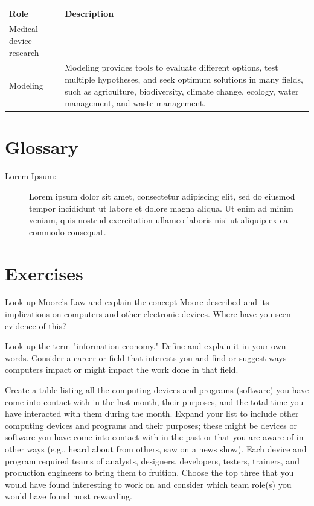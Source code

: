 \begin{table}[H]
	\begin{center}
		\begin{tabular}{p{1.3in}|p{3in}} 
			\textbf{Role} & \textbf{Description}\\
			\hline
			Medical device research & \\
			\hline
			Modeling & Modeling provides tools to evaluate different options, test multiple hypotheses, and seek optimum solutions in many fields, such as agriculture, biodiversity, climate change, ecology, water management, and waste management.\\
		\end{tabular}
	\end{center}
\end{table}

\section{Glossary}

\begin{description}
	
	\item[Lorem Ipsum:]  Lorem ipsum dolor sit amet, consectetur adipiscing elit, sed do eiusmod tempor incididunt ut labore et dolore magna aliqua. Ut enim ad minim veniam, quis nostrud exercitation ullamco laboris nisi ut aliquip ex ea commodo consequat.
	
\end{description}

\section{Exercises}

\begin{ex}
	Look up Moore's Law and explain the concept Moore described and its implications on computers and other electronic devices. Where have you seen evidence of this?	
\end{ex}

\begin{ex}
	Look up the term "information economy." Define and explain it in your own words. Consider a career or field that interests you and find or suggest ways computers impact or might impact the work done in that field.
\end{ex}

\begin{ex}
	Create a table listing all the computing devices and programs (software) you have come into contact with in the last month, their purposes, and the total time you have interacted with them during the month. Expand your list to include other computing devices and programs and their purposes; these might be devices or software you have come into contact with in the past or that you are aware of in other ways (e.g., heard about from others, saw on a news show). Each device and program required teams of analysts, designers, developers, testers, trainers, and production engineers to bring them to fruition. Choose the top three that you would have found interesting to work on and consider which team role(s) you would have found most rewarding.
	 
\end{ex}
